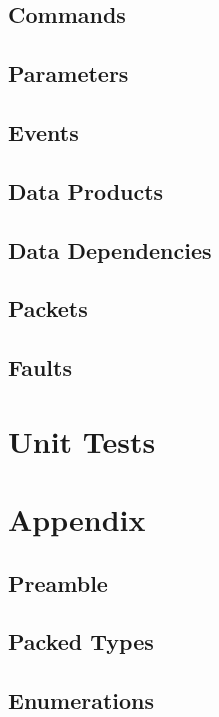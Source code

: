 \subsection{Commands}



\subsection{Parameters}



\subsection{Events}



\subsection{Data Products}



\subsection{Data Dependencies}



\subsection{Packets}



\subsection{Faults}



\section{Unit Tests}



\section{Appendix}

\subsection{Preamble}



\subsection{Packed Types}



\subsection{Enumerations}




